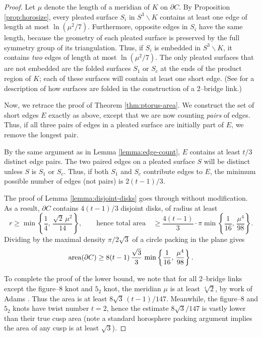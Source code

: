 \documentclass[11pt]{amsart}
\renewcommand{\setminus}{{\smallsetminus}}
\newcommand{\area}{{\rm area}}
\newcommand{\bdy}{{\partial}}
\theoremstyle{plain}
\theoremstyle{definition}
\begin{document}
\begin{proof}
Let $\mu$ denote the length of a meridian of $K$ on $\bdy C$.  By
Proposition \ref{prop:horosize}, every pleated surface $S_i$ in $S^3
\setminus K$ contains at least one edge of length at most
$\ln(\mu^2/7)$.  Furthermore, opposite edges in $S_i$ have the same
length, because the geometry of each pleated surface is preserved by
the full symmetry group of its triangulation.  Thus, if $S_i$ is
embedded in $S^3 \setminus K$, it contains \emph{two} edges of length
at most $\ln(\mu^2/7)$.  The only pleated surfaces that are not
embedded are the folded surfaces $S_1$ or $S_c$ at the ends of the
product region of $K$; each of these surfaces will contain at least
one short edge. (See \cite[Figure 19]{gf:two-bridge} for a description
of how surfaces are folded in the construction of a 2--bridge link.)

Now, we retrace the proof of Theorem \ref{thm:ptorus-area}.  We
construct the set of short edges $E$ exactly as above, except that we
are now counting \emph{pairs} of edges.  Thus, if all three pairs of
edges in a pleated surface are initially part of $E$, we remove the
longest pair.

By the same argument as in Lemma \ref{lemma:edge-count}, $E$ contains
at least $t/3$ distinct edge pairs.  The two paired edges on a pleated
surface $S$ will be distinct unless $S$ is $S_1$ or $S_c$.  Thus, if
both $S_1$ and $S_c$ contribute edges to $E$, the minimum possible
number of edges (not pairs) is $2(t-1)/3$.

The proof of Lemma \ref{lemma:disjoint-disks} goes through without
modification.  As a result, $\bdy C$ contains $4(t-1)/3$ disjoint
disks, of radius at least
$$r \geq \min \left\{ \frac{1}{4}, \, \frac{\sqrt{2} \, \mu^2}{14}
\right\}, \qquad \mbox{hence total area} \quad \geq \frac{4(t-1)}{3}
\cdot \pi \min\left\{\frac{1}{16}, \, \frac{\mu^4}{98} \right\}.$$
Dividing by the maximal density $\pi/2\sqrt{3}$ of a circle packing in
the plane gives
\begin{equation}\label{eqn:2bridge-area}
 \area(\bdy C) \geq 8(t-1) \, \frac{\sqrt{3}}{3} \,
\min\left\{\frac{1}{16}, \, \frac{\mu^4}{98} \right\}. 
\end{equation}

To complete the proof of the lower bound, we note that for all
2--bridge links except the figure--8 knot and $5_2$ knot, the meridian
$\mu$ is at least $\sqrt[4]{2}$, by work of Adams \cite{adams:waist2}.
Thus the area is at least $8\sqrt{3}\,(t-1)/147$.  Meanwhile, the
figure--8 and $5_2$ knots have twist number $t=2$, hence the estimate
$8\sqrt{3}/147$ is vastly lower than their true cusp area (note a
standard horosphere packing argument implies the area of any cusp is
at least $\sqrt{3}$).


\end{proof}
\end{document}
